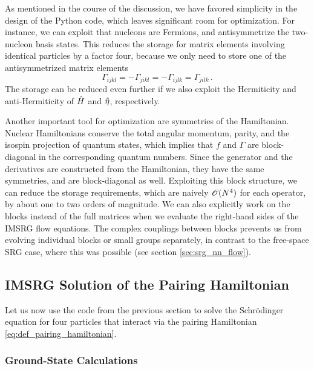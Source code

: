 As mentioned in the course of the discussion, we have favored simplicity 
in the design of the Python code, which leaves significant room for optimization.
For instance, we can exploit that nucleons are Fermions, and 
antisymmetrize the two-nucleon basis states. This reduces the storage for
matrix elements involving identical particles by a factor four, because
we only need to store one of the antisymmetrized matrix elements 
\begin{equation}
  \Gamma_{ijkl} = -\Gamma_{jikl} = - \Gamma_{ijlk} = \Gamma_{jilk}\,.
\end{equation}
The storage can be reduced even further if we also exploit the Hermiticity
and anti-Hermiticity of $\hat{H}$ and $\hat{\eta}$, respectively.

Another important tool for optimization are symmetries of the Hamiltonian.
Nuclear Hamiltonians conserve the total angular momentum, parity, and the 
isospin projection of quantum states, which implies that $f$ and $\Gamma$ 
are block-diagonal in the corresponding quantum numbers. Since the generator 
and the derivatives are constructed from the Hamiltonian, they have the
same symmetries, and are block-diagonal as well. Exploiting this block
structure, we can reduce the storage requirements, which are naively $\mathcal{O}(N^4)$
for each operator, by about one to two orders of magnitude. We can 
also explicitly work on the blocks instead of the full matrices when 
we evaluate the right-hand sides of the IMSRG flow equations.  The complex 
couplings between blocks prevents us from evolving individual blocks or
small groups separately, in contrast to the free-space SRG case, where
this was possible (see section \ref{sec:srg_nn_flow}). 



\subsection{\label{sec:imsrg_pairing}IMSRG Solution of the Pairing Hamiltonian}
Let us now use the code from the previous section to solve the 
Schr\"odinger equation for four particles that interact via the pairing
Hamiltonian \eqref{eq:def_pairing_hamiltonian}.

%
%
\subsubsection{Ground-State Calculations}

